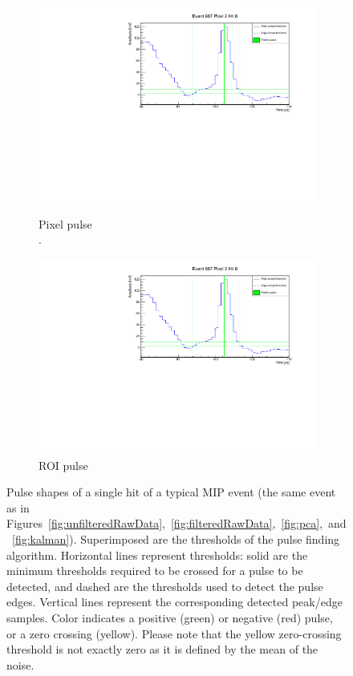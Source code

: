 \documentclass[instruments,article,accept,moreauthors,pdftex]{Definitions/mdpi}
\begin{document}
\begin{figure}[H]
	\centering
	\begin{subfigure}{.95\textwidth}
		\centering
		\includegraphics[viewport=0 0 550 290, clip, width=\textwidth, page=1]{event967_pixel2_hit8}\\
		\caption{Pixel pulse\\.}
		\label{fig:hitFinder_a}
	\end{subfigure}
	\begin{subfigure}{.95\textwidth}
		\centering
		\includegraphics[viewport=0 0 550 290, clip, width=\textwidth, page=3]{event967_pixel2_hit8}
		\caption{ROI pulse}
		\label{fig:hitFinder_b}
	\end{subfigure}
	\caption{Pulse shapes of a single hit of a typical MIP event (the same event as in \mbox{Figures~\ref{fig:unfilteredRawData},~\ref{fig:filteredRawData},~\ref{fig:pca}, and~\ref{fig:kalman}}).
		Superimposed are the thresholds of the pulse finding algorithm.
		Horizontal lines represent thresholds: solid are the minimum thresholds required to be crossed for a pulse to be detected, and dashed are the thresholds used to detect the pulse edges.
		Vertical lines represent the corresponding detected peak/edge samples.
		Color indicates a positive (green) or negative (red) pulse, or a zero crossing (yellow).
		Please note that the yellow zero-crossing threshold is not exactly zero as it is defined by the mean of the noise.}
	\label{fig:hitFinder}
\end{figure}
\end{document}
